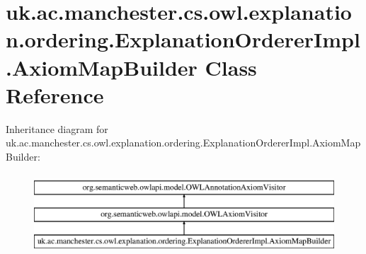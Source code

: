 \hypertarget{classuk_1_1ac_1_1manchester_1_1cs_1_1owl_1_1explanation_1_1ordering_1_1_explanation_orderer_impl_1_1_axiom_map_builder}{\section{uk.\-ac.\-manchester.\-cs.\-owl.\-explanation.\-ordering.\-Explanation\-Orderer\-Impl.\-Axiom\-Map\-Builder Class Reference}
\label{classuk_1_1ac_1_1manchester_1_1cs_1_1owl_1_1explanation_1_1ordering_1_1_explanation_orderer_impl_1_1_axiom_map_builder}
}
Inheritance diagram for uk.\-ac.\-manchester.\-cs.\-owl.\-explanation.\-ordering.\-Explanation\-Orderer\-Impl.\-Axiom\-Map\-Builder\-:\begin{figure}[H]
\begin{center}
\leavevmode
\includegraphics[height=3.000000cm]{classuk_1_1ac_1_1manchester_1_1cs_1_1owl_1_1explanation_1_1ordering_1_1_explanation_orderer_impl_1_1_axiom_map_builder}
\end{center}
\end{figure}
